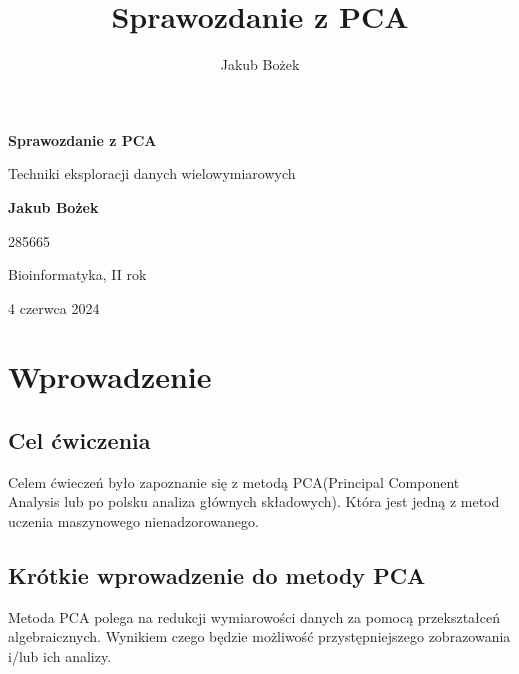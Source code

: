 \documentclass[12pt, a4paper]{article}
\author{Jakub Bożek}
\title{Sprawozdanie z PCA}
\begin{document}
\begin{titlepage}
    \centering
    {\LARGE \bfseries Sprawozdanie z PCA \par}
    \vspace{1cm}
    
    {\Large Techniki eksploracji danych wielowymiarowych \par}
    \vspace{2cm}
    
    {\LARGE \bfseries Jakub Bożek \par}
    \vspace{0.5cm}
    
    {\large 285665 \par}
    \vspace{0.5cm}
    
    {\large Bioinformatyka, II rok \par}
    \vspace{2cm}
    
    {\Large 4 czerwca 2024 \par}
    
    \newpage
    \thispagestyle{empty}

    \tableofcontents
\end{titlepage}

\section{Wprowadzenie}

    \subsection{Cel ćwiczenia}

        Celem ćwieczeń było zapoznanie się z metodą PCA(Principal Component Analysis lub po polsku analiza głównych składowych).
        Która jest jedną z metod uczenia maszynowego nienadzorowanego. 

    \subsection{Krótkie wprowadzenie do metody PCA}
        Metoda PCA polega na redukcji wymiarowości danych za pomocą przekształceń algebraicznych. Wynikiem czego będzie możliwość
        przystępniejszego zobrazowania i/lub ich analizy.
        
\end{document}
